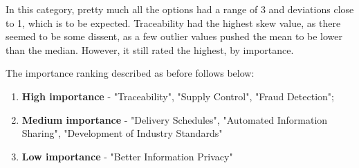 
In this category, pretty much all the options had a range of 3 and deviations close to 1, which is to be expected. Traceability had the highest skew value, as there seemed to be some dissent, as a few outlier values pushed the mean to be lower than the median. However, it still rated the highest, by importance. 

The importance ranking described as before follows below:

\begin{enumerate}
    \item \textbf{High importance} - "Traceability", "Supply Control", "Fraud Detection";
    \item \textbf{Medium importance} - "Delivery Schedules", "Automated Information Sharing", "Development of Industry Standards"
    \item \textbf{Low importance} - "Better Information Privacy"
\end{enumerate}

